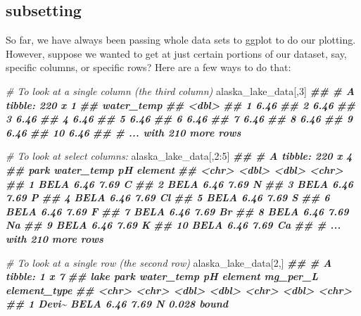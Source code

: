 \documentclass[
]{krantz}
\newenvironment{Shaded}{\begin{snugshade}}{\end{snugshade}}
\newcommand{\CommentTok}[1]{\textcolor[rgb]{0.56,0.35,0.01}{\textit{#1}}}
\newcommand{\DecValTok}[1]{\textcolor[rgb]{0.00,0.00,0.81}{#1}}
\newcommand{\DocumentationTok}[1]{\textcolor[rgb]{0.56,0.35,0.01}{\textbf{\textit{#1}}}}
\newcommand{\NormalTok}[1]{#1}
\newcommand{\SpecialCharTok}[1]{\textcolor[rgb]{0.00,0.00,0.00}{#1}}
\begin{document}
\hypertarget{subsetting}{%
\subsection{subsetting}\label{subsetting}}

So far, we have always been passing whole data sets to ggplot to do our plotting. However, suppose we wanted to get at just certain portions of our dataset, say, specific columns, or specific rows? Here are a few ways to do that:

\begin{Shaded}
\begin{Highlighting}[]
\CommentTok{\# To look at a single column (the third column)}
\NormalTok{alaska\_lake\_data[,}\DecValTok{3}\NormalTok{]}
\DocumentationTok{\#\# \# A tibble: 220 x 1}
\DocumentationTok{\#\#    water\_temp}
\DocumentationTok{\#\#         \textless{}dbl\textgreater{}}
\DocumentationTok{\#\#  1       6.46}
\DocumentationTok{\#\#  2       6.46}
\DocumentationTok{\#\#  3       6.46}
\DocumentationTok{\#\#  4       6.46}
\DocumentationTok{\#\#  5       6.46}
\DocumentationTok{\#\#  6       6.46}
\DocumentationTok{\#\#  7       6.46}
\DocumentationTok{\#\#  8       6.46}
\DocumentationTok{\#\#  9       6.46}
\DocumentationTok{\#\# 10       6.46}
\DocumentationTok{\#\# \# ... with 210 more rows}

\CommentTok{\# To look at select columns:}
\NormalTok{alaska\_lake\_data[,}\DecValTok{2}\SpecialCharTok{:}\DecValTok{5}\NormalTok{]}
\DocumentationTok{\#\# \# A tibble: 220 x 4}
\DocumentationTok{\#\#    park  water\_temp    pH element}
\DocumentationTok{\#\#    \textless{}chr\textgreater{}      \textless{}dbl\textgreater{} \textless{}dbl\textgreater{} \textless{}chr\textgreater{}  }
\DocumentationTok{\#\#  1 BELA        6.46  7.69 C      }
\DocumentationTok{\#\#  2 BELA        6.46  7.69 N      }
\DocumentationTok{\#\#  3 BELA        6.46  7.69 P      }
\DocumentationTok{\#\#  4 BELA        6.46  7.69 Cl     }
\DocumentationTok{\#\#  5 BELA        6.46  7.69 S      }
\DocumentationTok{\#\#  6 BELA        6.46  7.69 F      }
\DocumentationTok{\#\#  7 BELA        6.46  7.69 Br     }
\DocumentationTok{\#\#  8 BELA        6.46  7.69 Na     }
\DocumentationTok{\#\#  9 BELA        6.46  7.69 K      }
\DocumentationTok{\#\# 10 BELA        6.46  7.69 Ca     }
\DocumentationTok{\#\# \# ... with 210 more rows}

\CommentTok{\# To look at a single row (the second row)}
\NormalTok{alaska\_lake\_data[}\DecValTok{2}\NormalTok{,]}
\DocumentationTok{\#\# \# A tibble: 1 x 7}
\DocumentationTok{\#\#   lake  park  water\_temp    pH element mg\_per\_L element\_type}
\DocumentationTok{\#\#   \textless{}chr\textgreater{} \textless{}chr\textgreater{}      \textless{}dbl\textgreater{} \textless{}dbl\textgreater{} \textless{}chr\textgreater{}      \textless{}dbl\textgreater{} \textless{}chr\textgreater{}       }
\DocumentationTok{\#\# 1 Devi\textasciitilde{} BELA        6.46  7.69 N          0.028 bound}


\end{Highlighting}
\end{Shaded}
\end{document}
